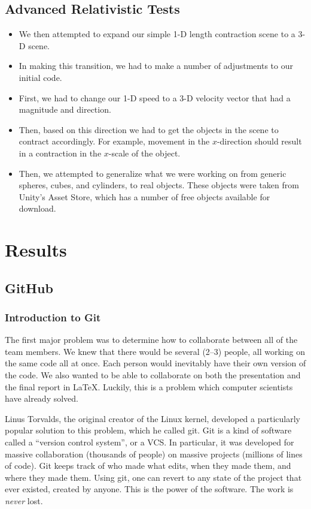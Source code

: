 \documentclass[12pt]{article}
\begin{document}
\subsection{Advanced Relativistic Tests}
\begin{itemize}
	\item We then attempted to expand our simple 1-D length contraction scene to a 3-D scene.
	\item In making this transition, we had to make a number of adjustments to our initial code. 
	\item First, we had to change our 1-D speed to a 3-D velocity vector that had a magnitude and direction. 
	\item Then, based on this direction we had to get the objects in the scene to contract accordingly. For example, movement in the $x$-direction should result in a contraction in the $x$-scale of the object.
	\item Then, we attempted to generalize what we were working on from generic spheres, cubes, and cylinders, to real objects. These objects were taken from Unity's Asset Store, which has a number of free objects available for download. 
\end{itemize}

\section{Results}

\subsection{GitHub}
\subsubsection{Introduction to Git}
The first major problem was to determine how to collaborate between all of the team members. We knew that there would be several (2--3) people, all working on the same code all at once. Each person would inevitably have their own version of the code. We also wanted to be able to collaborate on both the presentation and the final report in \LaTeX{}. Luckily, this is a problem which computer scientists have already solved.

Linus Torvalds, the original creator of the Linux kernel, developed a particularly popular solution to this problem, which he called git. Git is a kind of software called a \enquote{version control system}, or a VCS. In particular, it was developed for massive collaboration (thousands of people) on massive projects (millions of lines of code). Git keeps track of who made what edits, when they made them, and where they made them. Using git, one can revert to any state of the project that ever existed, created by anyone. This is the power of the software. The work is \emph{never} lost. 
\end{document}

